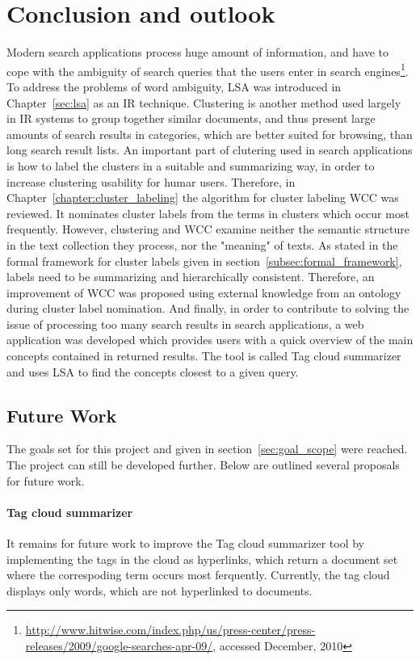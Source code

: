 \chapter{Conclusion and outlook}
\label{sec:conclusion}
Modern search applications process huge amount of information, and have to cope with the ambiguity of search queries that the users enter in search engines\footnote{\url{http://www.hitwise.com/index.php/us/press-center/press-releases/2009/google-searches-apr-09/}, accessed December, 2010}. To address the problems of word ambiguity, \gls{LSA} was introduced in Chapter~\ref{sec:lsa} as an \gls{IR} technique. Clustering is another method used largely in \gls{IR} systems to group together similar documents, and thus present large amounts of search results in categories, which are better suited for browsing, than long search result lists. An important part of clutering used in search applications is how to label the clusters in a suitable and summarizing way, in order to increase clustering usability for humar users. Therefore, in Chapter~\ref{chapter:cluster_labeling} the algorithm for cluster labeling \gls{WCC} was reviewed. It nominates cluster labels from the terms in clusters which occur most frequently. However, clustering and \gls{WCC} examine neither the semantic structure in the text collection they process, nor the "meaning" of texts. As stated in the formal framework for cluster labels given in section~\ref{subsec:formal_framework}, labels need to be summarizing and hierarchically consistent. Therefore, an improvement of \gls{WCC} was proposed using external knowledge from an ontology during cluster label nomination.  And finally, in order to contribute to solving the issue of processing too many search results in search applications,  a web application was developed which provides users with a quick overview of the main concepts contained in returned results. The tool is called Tag cloud summarizer and uses \gls{LSA} to find the concepts closest to a given query. \\

\section{Future Work}
The goals set for this project and given in section~\ref{sec:goal_scope} were reached. The project can still be developed further. Below are outlined several proposals for future work. \\

\subsubsection{Tag cloud summarizer}
It remains for future work to improve the Tag cloud summarizer tool by implementing the tags in the cloud as hyperlinks, which return a document set where the correspoding term occurs most ferquently. Currently, the tag cloud displays only words, which are not hyperlinked to documents.  \\


